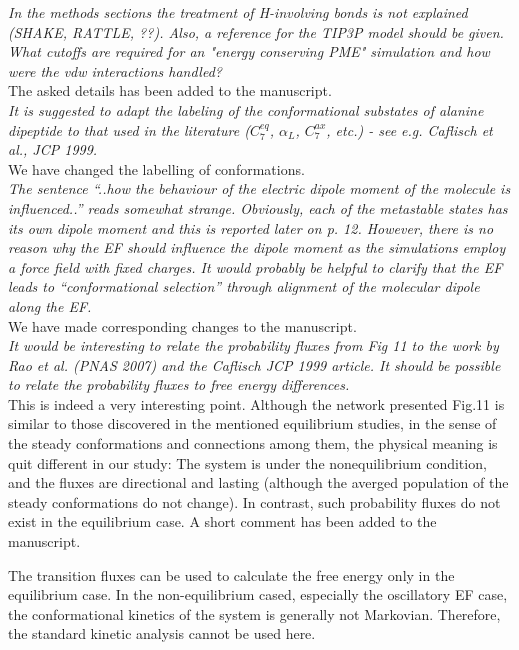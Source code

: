 \documentclass[]{revtex4-1}
\begin{document}
\emph{ In the methods sections the treatment of H-involving bonds is
  not explained (SHAKE, RATTLE, ??). Also, a reference for the TIP3P
  model should be given. What cutoffs are required for an "energy
  conserving PME" simulation and how were the vdw interactions
  handled?  }\\

The asked details has been added to the manuscript.\\

\emph{
It is suggested to adapt the labeling of the conformational substates
of alanine dipeptide to that used in the literature ($C_7^{eq}$, $\alpha_L$,
$C_7^{ax}$, etc.) - see e.g. Caflisch et al., JCP 1999.
}\\

We have changed the labelling of conformations.\\

\emph{
The sentence ``..how the behaviour of the electric dipole moment of the
molecule is influenced..'' reads somewhat strange. Obviously, each of
the metastable states has its own dipole moment and this is reported
later on p. 12. However, there is no reason why the EF should
\emph{influence} the dipole moment as the simulations employ a force field
with fixed charges. It would probably be helpful to clarify that the
EF leads to ``conformational selection'' through alignment of the
molecular dipole along the EF.
}\\

We have made corresponding changes to the manuscript.\\

\emph{ It would be interesting to relate the probability fluxes from
  Fig 11 to the work by Rao et al. (PNAS 2007) and the Caflisch JCP
  1999 article. It should be possible to relate the probability fluxes
  to free energy differences.}\\

This is indeed a very interesting point.
Although the network presented Fig.11 is similar to those
discovered in the mentioned equilibrium studies,
in the sense of the steady conformations and connections among them,
the physical meaning is quit different in our study:
The system is under the nonequilibrium condition, and
the fluxes are directional and lasting (although the averged population of the steady conformations do not change). In contrast,
such probability fluxes do not exist in the equilibrium case.
A short comment has been added to the
manuscript.

The transition fluxes can be used to calculate the free energy only in
the equilibrium case. In the non-equilibrium cased, especially the
oscillatory EF case, the conformational kinetics of the system is generally
not Markovian. Therefore, the standard kinetic analysis cannot be used
here.
\end{document}
